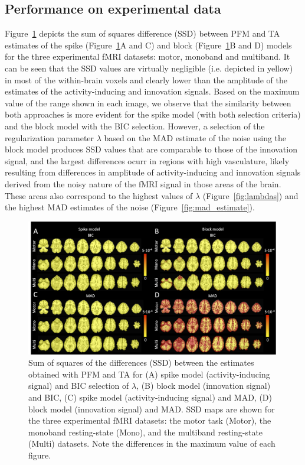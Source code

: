 \subsection{Performance on experimental data}

Figure~\ref{fig:rss} depicts the sum of squares difference (SSD) between PFM and TA estimates of the spike (Figure~\ref{fig:rss}A and C) and block (Figure~\ref{fig:rss}B and D) models for the three experimental fMRI datasets: motor, monoband and multiband. It can be seen that the SSD values are virtually negligible (i.e. depicted in yellow) in most of the within-brain voxels and clearly lower than the amplitude of the estimates of the activity-inducing and innovation signals. Based on the maximum value of the range shown in each image, we observe that the similarity between both approaches is more evident for the spike model (with both selection criteria) and the block model with the BIC selection. However, a selection of the regularization parameter $\lambda$ based on the MAD estimate of the noise using the block model produces SSD values that are comparable to those of the innovation signal, and the largest differences ocurr in regions with high vasculature, likely resulting from differences in amplitude of activity-inducing and innovation signals derived from the noisy nature of the fMRI signal in those areas of the brain. These areas also correspond to the highest values of $\lambda$ (Figure~\ref{fig:lambdas}) and the highest MAD estimates of the noise (Figure~\ref{fig:mad_estimate}). 

\begin{figure}[t!]
    \begin{center}
        \includegraphics[width=\textwidth]{figures/comp_figure.png}
    \end{center}
    \caption{Sum of squares of the differences (SSD) between the estimates obtained with PFM and TA for (A) spike model (activity-inducing signal) and BIC selection of $\lambda$, (B) block model (innovation signal) and BIC, (C) spike model (activity-inducing signal) and MAD, (D) block model (innovation signal) and MAD. SSD maps are shown for the three experimental fMRI datasets: the motor task (Motor), the monoband resting-state (Mono), and the multiband resting-state (Multi) datasets. Note the differences in the maximum value of each figure.}
\label{fig:rss}
\end{figure}

